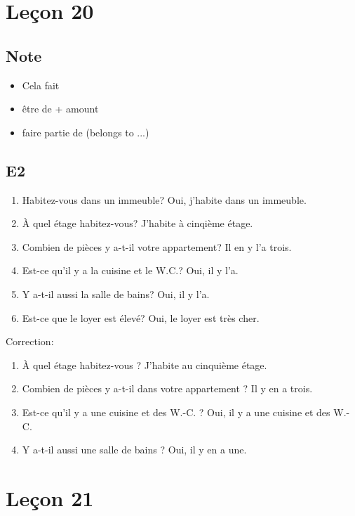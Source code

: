 \documentclass{book}
\begin{document}
\chapter{Leçon 20}  
    \section{Note}
        \begin{itemize}
            \item Cela fait 
            \item être de + amount
            \item faire partie de (belongs to ...)
        \end{itemize}
    \section{E2}
        \begin{enumerate}
            \item Habitez-vous dans un immeuble? Oui, j'habite dans un immeuble.
            \item À quel étage habitez-vous? J'habite à cinqième étage.
            \item Combien de pièces y a-t-il votre appartement? Il en y l'a trois.
            \item Est-ce qu'il y a la cuisine et le W.C.? Oui, il y l'a.
            \item Y a-t-il aussi la salle de bains? Oui, il y l'a.
            \item Est-ce que le loyer est élevé? Oui, le loyer est très cher.
        \end{enumerate}
        Correction:
        \begin{enumerate}
            \item À quel étage habitez-vous ? J'habite au cinquième étage.
            \item Combien de pièces y a-t-il dans votre appartement ? Il y en a trois.
            \item Est-ce qu'il y a une cuisine et des W.-C. ? Oui, il y a une cuisine et des W.-C.
            \item Y a-t-il aussi une salle de bains ? Oui, il y en a une.
        \end{enumerate}

\chapter{Leçon 21}
\end{document}

